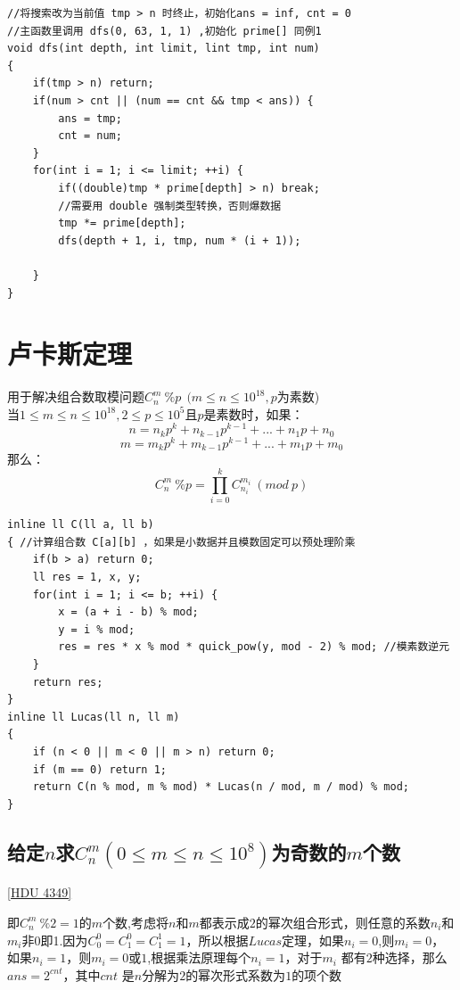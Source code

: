\begin{lstlisting}
//将搜索改为当前值 tmp > n 时终止，初始化ans = inf, cnt = 0
//主函数里调用 dfs(0, 63, 1, 1) ,初始化 prime[] 同例1
void dfs(int depth, int limit, lint tmp, int num)
{
	if(tmp > n) return;
	if(num > cnt || (num == cnt && tmp < ans)) {
		ans = tmp;
		cnt = num;
	}
	for(int i = 1; i <= limit; ++i) {
		if((double)tmp * prime[depth] > n) break;
        //需要用 double 强制类型转换，否则爆数据
		tmp *= prime[depth];
		dfs(depth + 1, i, tmp, num * (i + 1));

	}
}
\end{lstlisting}

\section{卢卡斯定理}

用于解决组合数取模问题$C_{n}^{m}\ \% p\ \ (m\leq n \leq 10^{18},p$为素数) \\

当$1\leq m \leq n \leq 10^{18},2\leq p \leq 10^5$且$p$是素数时，如果： \\
$$n=n_kp^k+n_{k-1}p^{k-1}+...+n_1p+n_0$$
$$m=m_kp^k+m_{k-1}p^{k-1}+...+m_1p+m_0$$
那么： \\
$$C_{n}^{m}\ \% p=\prod_{i=0}^{k}C_{n_i}^{m_i}\ (mod \ p)$$
\begin{lstlisting}
inline ll C(ll a, ll b)
{ //计算组合数 C[a][b] ，如果是小数据并且模数固定可以预处理阶乘
	if(b > a) return 0;
	ll res = 1, x, y;
	for(int i = 1; i <= b; ++i) {
		x = (a + i - b) % mod;
		y = i % mod;
		res = res * x % mod * quick_pow(y, mod - 2) % mod; //模素数逆元
	}
	return res;
}
inline ll Lucas(ll n, ll m)
{
	if (n < 0 || m < 0 || m > n) return 0;
	if (m == 0) return 1;
	return C(n % mod, m % mod) * Lucas(n / mod, m / mod) % mod;
}
\end{lstlisting}

\subsection{给定$n$求$C_{n}^{m}(0\leq m\leq n\leq 10^8)$为奇数的$m$个数}

\underline {[HDU 4349]}

即$C_{n}^{m}\ \%2=1$的$m$个数,考虑将$n$和$m$都表示成$2$的幂次组合形式，则任意的系数$n_i$和$m_i$非0即1.因为$C_0^0=C_1^0=C_1^1=1$，所以根据$Lucas$定理，如果$n_i=0$,则$m_i=0$，如果$n_i=1$，则$m_i=0$或$1$,根据乘法原理每个$n_i=1$，对于$m_i$ 都有$2$种选择，那么$ans=2^{cnt}$，其中$cnt$ 是$n$分解为$2$的幂次形式系数为$1$的项个数

